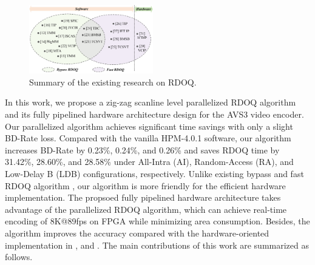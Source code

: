 \documentclass[lettersize,journal]{IEEEtran}
\begin{document}
\begin{figure}[!h]
	\centering
	\centerline{\includegraphics[width=0.48\textwidth]{figure/Summary_rdoq.png}} 
	\caption{Summary of the existing research on RDOQ.}
	\label{summary} %
\end{figure}
\par
In this work, we propose a zig-zag scanline level parallelized RDOQ algorithm and its fully pipelined hardware architecture design for the AVS3 video encoder. Our parallelized algorithm achieves significant time savings with only a slight BD-Rate loss. Compared with the vanilla HPM-4.0.1 software, our algorithm increases BD-Rate by 0.23\%, 0.24\%, and 0.26\% and saves RDOQ time by 31.42\%, 28.60\%, and 28.58\% under All-Intra (AI), Random-Access (RA), and Low-Delay B (LDB) configurations, respectively. Unlike existing bypass and fast RDOQ algorithm \cite{lee2016all-zero, wang2017fastrdoq, fan2016hybridzreoblock, cui2018hybrid, cui2017adaptive, wei2019all, yin2018efficient, yin2020multistageallzerodetection, lee2015fastquantizationmethod, zhang2015fastrdoq, xu2018simplifiedrdoq, xu2020simplifiedLevelEstimation, huang2015efficientquantization, cui2017Laplacedistributionbased, he2015highimplementationrdoq, wang2016improvedrdoq, canh2018rate, kianfar2020parallelized}, our algorithm is more friendly for the efficient hardware implementation. 
The propsoed fully pipelined hardware architecture takes advantage of the parallelized RDOQ algorithm, which can achieve real-time encoding of 8K@89fps on FPGA while minimizing area consumption. Besides, the algorithm improves the accuracy compared with the hardware-oriented implementation in \cite{igarashi2018parallelGPU, xu2022hardwarefriendlyforrdoq}, and \cite{zhao2023scanline}. The main contributions of this work are summarized as follows. 
\end{document}
